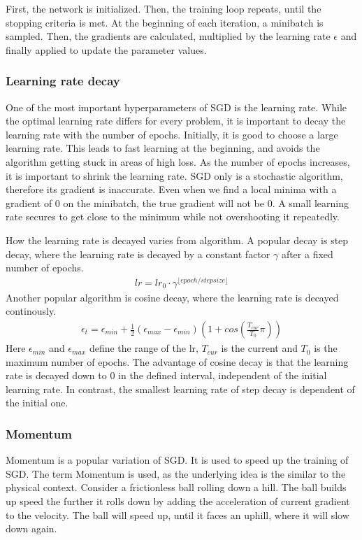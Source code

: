 First, the network is initialized. Then, the training loop repeats, until the
stopping criteria is met. At the beginning of each iteration, a minibatch is sampled. Then, the
gradients are calculated, multiplied by the learning rate $\epsilon$ and finally
applied to update the parameter values.


\subsubsection{Learning rate decay}\label{sub:Learing_rate_decay}
One of the most important hyperparameters of SGD is the learning rate. While the
optimal learning rate differs for every problem, it is important to decay the
learning rate with the number of epochs. Initially, it is good to choose a
large learning rate. This leads to fast learning at the beginning, and avoids
the algorithm getting stuck in areas of high loss. As the number of epochs
increases, it is important to shrink the learning rate. SGD only is a stochastic
algorithm, therefore its gradient is inaccurate. Even when we find a local
minima with a gradient of 0 on the minibatch, the true gradient will not be 0. A
small learning rate secures to get close to the minimum while not overshooting it
repeatedly.

How the learning rate is decayed varies from algorithm. A popular decay is step
decay, where the learning rate is decayed by a constant factor $\gamma$ after a
fixed number of epochs.
\begin{align}
    lr = lr_0 \cdot \gamma^{\lfloor epoch/stepsize \rfloor}
\end{align}
Another popular algorithm is cosine decay, where the learning rate is decayed
continously.
\begin{align}\label{eq:cosine_decay}
    \epsilon_t = \epsilon_{min} + \frac{1}{2} (\epsilon_{max} - \epsilon_{min})(1+cos(\frac{T_{cur}}{T_0}\pi))
\end{align}
Here $\epsilon_{min}$ and $\epsilon_{max}$ define the range of the lr, $T_{cur}$
is the current and $T_0$ is the maximum number of epochs. The advantage of
cosine decay is that the learning rate is decayed down to 0 in the defined
interval, independent of the initial learning rate. In contrast, the smallest
learning rate of step decay is dependent of the initial one.

\subsubsection{Momentum}\label{sub:Momentum}
Momentum is a popular variation of SGD. It is used to speed up the training of
SGD. The term Momentum is used, as the underlying idea is the similar to the
physical context. Consider a frictionless ball rolling down a hill. The ball
builds up speed the further it rolls down by adding the acceleration of current
gradient to the velocity. The ball will speed up, until it faces an uphill,
where it will slow down again.

